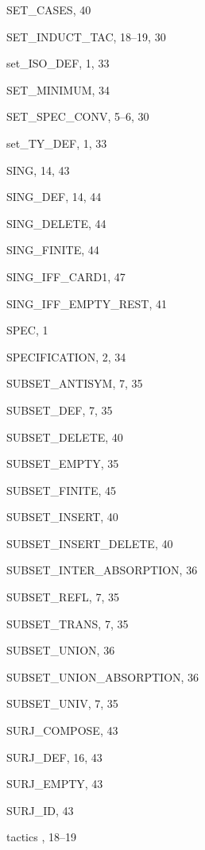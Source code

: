 \begin{theindex}
  \item {\ptt SET\_CASES}, 40
  \item {\ptt SET\_INDUCT\_TAC}, 18--19, 30
  \item {\ptt set\_ISO\_DEF}, 1, 33
  \item {\ptt SET\_MINIMUM}, 34
  \item {\ptt SET\_SPEC\_CONV}, 5--6, 30
  \item {\ptt set\_TY\_DEF}, 1, 33
  \item {\ptt SING}, 14, 43
  \item {\ptt SING\_DEF}, 14, 44
  \item {\ptt SING\_DELETE}, 44
  \item {\ptt SING\_FINITE}, 44
  \item {\ptt SING\_IFF\_CARD1}, 47
  \item {\ptt SING\_IFF\_EMPTY\_REST}, 41
  \item {\ptt SPEC}, 1
  \item {\ptt SPECIFICATION}, 2, 34
  \item {\ptt SUBSET\_ANTISYM}, 7, 35
  \item {\ptt SUBSET\_DEF}, 7, 35
  \item {\ptt SUBSET\_DELETE}, 40
  \item {\ptt SUBSET\_EMPTY}, 35
  \item {\ptt SUBSET\_FINITE}, 45
  \item {\ptt SUBSET\_INSERT}, 40
  \item {\ptt SUBSET\_INSERT\_DELETE}, 40
  \item {\ptt SUBSET\_INTER\_ABSORPTION}, 36
  \item {\ptt SUBSET\_REFL}, 7, 35
  \item {\ptt SUBSET\_TRANS}, 7, 35
  \item {\ptt SUBSET\_UNION}, 36
  \item {\ptt SUBSET\_UNION\_ABSORPTION}, 36
  \item {\ptt SUBSET\_UNIV}, 7, 35
  \item {\ptt SURJ\_COMPOSE}, 43
  \item {\ptt SURJ\_DEF}, 16, 43
  \item {\ptt SURJ\_EMPTY}, 43
  \item {\ptt SURJ\_ID}, 43

  \indexspace

  \item tactics
    , 18--19

  \indexspace


\end{theindex}
